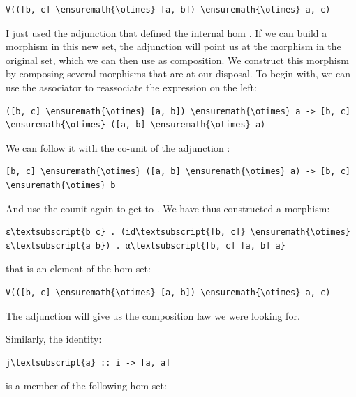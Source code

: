 \begin{Verbatim}[commandchars=\\\{\}]
V(([b, c] \ensuremath{\otimes} [a, b]) \ensuremath{\otimes} a, c)
\end{Verbatim}
I just used the adjunction that defined the internal hom
\code{{[}a, c{]}}. If we can build a morphism in this new set, the
adjunction will point us at the morphism in the original set, which we
can then use as composition. We construct this morphism by composing
several morphisms that are at our disposal. To begin with, we can use
the associator  to reassociate the
expression on the left:

\begin{Verbatim}[commandchars=\\\{\}]
([b, c] \ensuremath{\otimes} [a, b]) \ensuremath{\otimes} a -> [b, c] \ensuremath{\otimes} ([a, b] \ensuremath{\otimes} a)
\end{Verbatim}
We can follow it with the co-unit of the adjunction :

\begin{Verbatim}[commandchars=\\\{\}]
[b, c] \ensuremath{\otimes} ([a, b] \ensuremath{\otimes} a) -> [b, c] \ensuremath{\otimes} b
\end{Verbatim}
And use the counit  again to get to . We have
thus constructed a morphism:

\begin{Verbatim}[commandchars=\\\{\}]
ε\textsubscript{b c} . (id\textsubscript{[b, c]} \ensuremath{\otimes} ε\textsubscript{a b}) . α\textsubscript{[b, c] [a, b] a}
\end{Verbatim}
that is an element of the hom-set:

\begin{Verbatim}[commandchars=\\\{\}]
V(([b, c] \ensuremath{\otimes} [a, b]) \ensuremath{\otimes} a, c)
\end{Verbatim}
The adjunction will give us the composition law we were looking for.

Similarly, the identity:

\begin{Verbatim}[commandchars=\\\{\}]
j\textsubscript{a} :: i -> [a, a]
\end{Verbatim}
is a member of the following hom-set:

